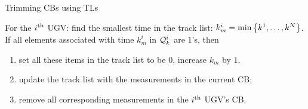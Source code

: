	
	
	\begin{algorithm}
		\caption{Trimming CBs using TLs}
		\label{alg:tracklist}
		\begin{algorithmic}
			\State 
			For the $i^\text{th}$ UGV:			
			find the smallest time in the track list: $k^i_m=\min\left\lbrace k^{1},\dots,k^{N} \right\rbrace$. 			
			If all elements associated with time $k^i_m$ in $\mathcal{Q}^i_k$ are $1$'s, then 
			\begin{enumerate}
				\item set all these items in the track list to be $0$, increase $k_m$ by $1$.
				\item update the track list with the measurements in the current CB;
				\item remove all corresponding measurements in the $i^\text{th}$ UGV's CB.
			\end{enumerate}				
		\end{algorithmic}
	\end{algorithm}
	
